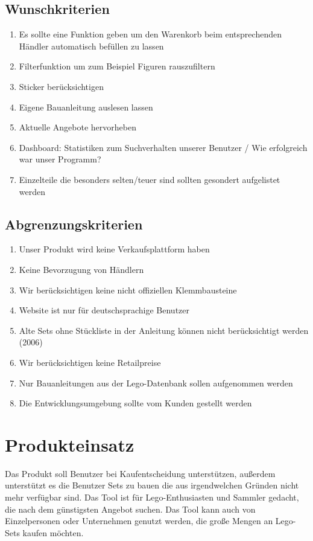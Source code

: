 \subsection{Wunschkriterien}
\begin{enumerate}
\item Es sollte eine Funktion geben um den Warenkorb beim entsprechenden Händler automatisch befüllen zu lassen
\item Filterfunktion um zum Beispiel Figuren rauszufiltern
\item Sticker berücksichtigen
\item Eigene Bauanleitung auslesen lassen
\item Aktuelle Angebote hervorheben
\item Dashboard: Statistiken zum Suchverhalten unserer Benutzer / Wie erfolgreich war unser Programm?
\item Einzelteile die besonders selten/teuer sind sollten gesondert aufgelistet werden
\end{enumerate}

\subsection{Abgrenzungskriterien}
\begin{enumerate}
\item Unser Produkt wird keine Verkaufsplattform haben
\item Keine Bevorzugung von Händlern
\item Wir berücksichtigen keine nicht offiziellen Klemmbausteine
\item Website ist nur für deutschsprachige Benutzer
\item Alte Sets ohne Stückliste in der Anleitung können nicht berücksichtigt werden (2006)
\item Wir berücksichtigen keine Retailpreise
\item Nur Bauanleitungen aus der Lego-Datenbank sollen aufgenommen werden
\item Die Entwicklungsumgebung sollte vom Kunden gestellt werden
\end{enumerate}

\section{Produkteinsatz}
 Das Produkt soll Benutzer bei Kaufentscheidung unterstützen, außerdem unterstützt es die Benutzer Sets zu bauen die aus irgendwelchen Gründen nicht mehr verfügbar sind.\newline
Das Tool ist für Lego-Enthusiasten und Sammler gedacht, die nach dem günstigsten Angebot suchen. Das Tool kann auch von Einzelpersonen oder Unternehmen genutzt werden, die große Mengen an Lego-Sets kaufen möchten. \newline

